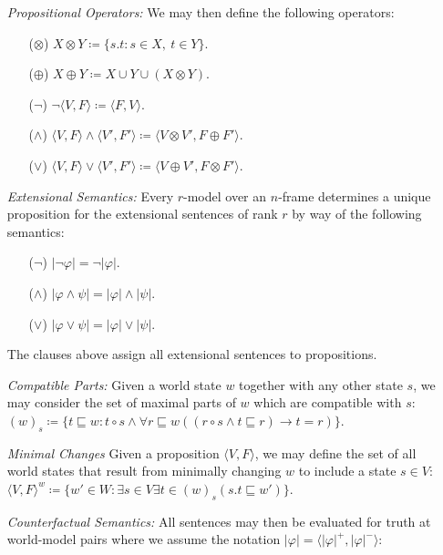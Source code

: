 \documentclass[a4paper, 11pt]{article} %
\newcommand{\tuple}[1]{\langle#1\rangle} %
\newcommand{\set}[1]{\lbrace#1\rbrace} %
\renewcommand{\vert}[1]{\lvert#1\rvert}
\begin{document}
\begin{enumerate}
  \item[\it Propositional Operators:] We may then define the following operators:
    \begin{itemize}
      \item[($\otimes$)] $X \otimes Y \coloneq \set{s.t : s \in X,\ t \in Y}$.
      \item[($\oplus$)] $X \oplus Y \coloneq X \cup Y \cup (X \otimes Y)$.
      \item[($\neg$)] $\neg\tuple{V,F} \coloneq \tuple{F,V}$.
      \item[($\wedge$)] $\tuple{V,F}\wedge\tuple{V',F'} \coloneq \tuple{V\otimes V',F\oplus F'}$.
      \item[($\vee$)] $\tuple{V,F}\vee\tuple{V',F'} \coloneq \tuple{V\oplus V',F\otimes F'}$.
    \end{itemize}
  \item[\it Extensional Semantics:] Every $r$-model over an $n$-frame determines a unique proposition for the extensional sentences of rank $r$ by way of the following semantics: 
    \begin{itemize}
      \item[($\neg$)] $\vert{\neg\varphi}=\neg\vert{\varphi}$.
      \item[($\wedge$)] $\vert{\varphi\wedge\psi}=\vert{\varphi}\wedge\vert{\psi}$.
      \item[($\vee$)] $\vert{\varphi\vee\psi}=\vert{\varphi}\vee\vert{\psi}$.
    \end{itemize}
    The clauses above assign all extensional sentences to propositions.
  \item[\it Compatible Parts:] Given a world state $w$ together with any other state $s$, we may consider the set of maximal parts of $w$ which are compatible with $s$:\\ 
    $(w)_s\coloneq \set{t\sqsubseteq w:t\circ s \wedge \forall r\sqsubseteq w((r\circ s \wedge t \sqsubseteq r) \rightarrow t = r)}$.
  \item[\it Minimal Changes] Given a proposition $\tuple{V,F}$, we may define the set of all world states that result from minimally changing $w$ to include a state $s\in V$:\\ 
      $\tuple{V,F}^w\coloneq \set{w'\in W:\exists s\in V\exists t\in(w)_s(s.t\sqsubseteq w')}$.
  \item[\it Counterfactual Semantics:] All sentences may then be evaluated for truth at world-model pairs where we assume the notation $\vert{\varphi}=\tuple{\vert{\varphi}^+,\vert{\varphi}^-}$:

\end{enumerate}
\end{document}
